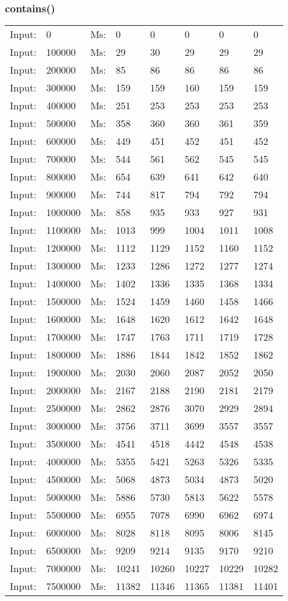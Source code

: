 \documentclass[11pt,a4paper]{report}
\begin{document}
\begin{tiny}
\subsubsection{contains()}
\begin{tabular}{l l ||l  l  l  l  l  l}
Input:&0&Ms:&0&0&0&0&0\\
Input:&100000&Ms:&29&30&29&29&29\\
Input:&200000&Ms:&85&86&86&86&86\\
Input:&300000&Ms:&159&159&160&159&159\\
Input:&400000&Ms:&251&253&253&253&253\\
Input:&500000&Ms:&358&360&360&361&359\\
Input:&600000&Ms:&449&451&452&451&452\\
Input:&700000&Ms:&544&561&562&545&545\\
Input:&800000&Ms:&654&639&641&642&640\\
Input:&900000&Ms:&744&817&794&792&794\\
Input:&1000000&Ms:&858&935&933&927&931\\
Input:&1100000&Ms:&1013&999&1004&1011&1008\\
Input:&1200000&Ms:&1112&1129&1152&1160&1152\\
Input:&1300000&Ms:&1233&1286&1272&1277&1274\\
Input:&1400000&Ms:&1402&1336&1335&1368&1334\\
Input:&1500000&Ms:&1524&1459&1460&1458&1466\\
Input:&1600000&Ms:&1648&1620&1612&1642&1648\\
Input:&1700000&Ms:&1747&1763&1711&1719&1728\\
Input:&1800000&Ms:&1886&1844&1842&1852&1862\\
Input:&1900000&Ms:&2030&2060&2087&2052&2050\\
Input:&2000000&Ms:&2167&2188&2190&2181&2179\\
Input:&2500000&Ms:&2862&2876&3070&2929&2894\\
Input:&3000000&Ms:&3756&3711&3699&3557&3557\\
Input:&3500000&Ms:&4541&4518&4442&4548&4538\\
Input:&4000000&Ms:&5355&5421&5263&5326&5335\\
Input:&4500000&Ms:&5068&4873&5034&4873&5020\\
Input:&5000000&Ms:&5886&5730&5813&5622&5578\\
Input:&5500000&Ms:&6955&7078&6990&6962&6974\\
Input:&6000000&Ms:&8028&8118&8095&8006&8145\\
Input:&6500000&Ms:&9209&9214&9135&9170&9210\\
Input:&7000000&Ms:&10241&10260&10227&10229&10282\\
Input:&7500000&Ms:&11382&11346&11365&11381&11401\\
\end{tabular}


\end{tiny}
\end{document}
